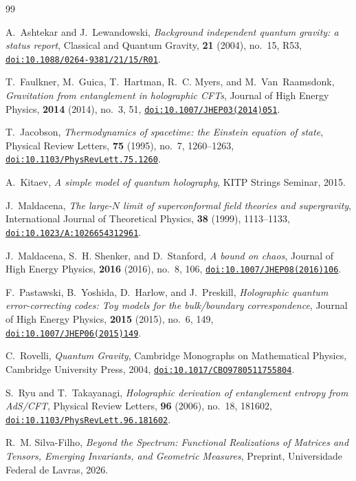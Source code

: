 \documentclass[11pt,a4paper,reqno]{amsart}
\theoremstyle{definition}
\numberwithin{equation}{section}
\providecommand{\doi}[1]{\href{https://doi.org/#1}{\nolinkurl{doi:#1}}}
\begin{document}
\begin{thebibliography}{99}

A.~Ashtekar and J.~Lewandowski,
\emph{Background independent quantum gravity: a status report},
Classical and Quantum Gravity, \textbf{21} (2004), no.~15, R53,
\doi{10.1088/0264-9381/21/15/R01}.

T.~Faulkner, M.~Guica, T.~Hartman, R.~C. Myers, and M.~Van~Raamsdonk,
\emph{Gravitation from entanglement in holographic CFTs},
Journal of High Energy Physics, \textbf{2014} (2014), no.~3, 51,
\doi{10.1007/JHEP03(2014)051}.

T.~Jacobson,
\emph{Thermodynamics of spacetime: the Einstein equation of state},
Physical Review Letters, \textbf{75} (1995), no.~7, 1260--1263,
\doi{10.1103/PhysRevLett.75.1260}.

A.~Kitaev,
\emph{A simple model of quantum holography},
KITP Strings Seminar, 2015.

J.~Maldacena,
\emph{The large-$N$ limit of superconformal field theories and supergravity},
International Journal of Theoretical Physics, \textbf{38} (1999), 1113--1133,
\doi{10.1023/A:1026654312961}.

J.~Maldacena, S.~H. Shenker, and D.~Stanford,
\emph{A bound on chaos},
Journal of High Energy Physics, \textbf{2016} (2016), no.~8, 106,
\doi{10.1007/JHEP08(2016)106}.

F.~Pastawski, B.~Yoshida, D.~Harlow, and J.~Preskill,
\emph{Holographic quantum error-correcting codes: Toy models for the bulk/boundary correspondence},
Journal of High Energy Physics, \textbf{2015} (2015), no.~6, 149,
\doi{10.1007/JHEP06(2015)149}.

C.~Rovelli,
\emph{Quantum Gravity},
Cambridge Monographs on Mathematical Physics, Cambridge University Press, 2004,
\doi{10.1017/CBO9780511755804}.

S.~Ryu and T.~Takayanagi,
\emph{Holographic derivation of entanglement entropy from AdS/CFT},
Physical Review Letters, \textbf{96} (2006), no.~18, 181602,
\doi{10.1103/PhysRevLett.96.181602}.

R.~M. Silva-Filho,
\emph{Beyond the Spectrum: Functional Realizations of Matrices and Tensors, Emerging Invariants, and Geometric Measures},
Preprint, Universidade Federal de Lavras, 2026.


\end{thebibliography}
\end{document}
